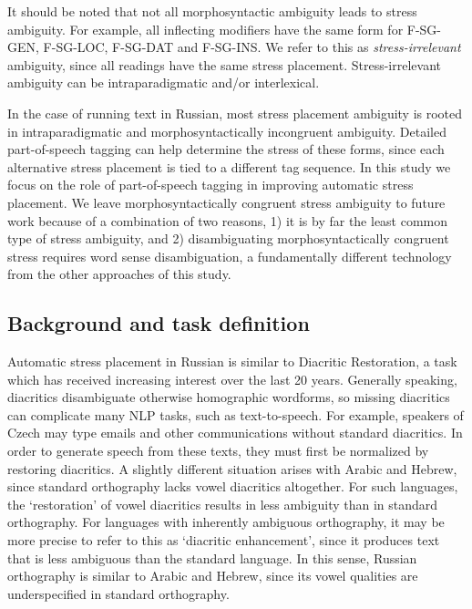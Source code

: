 \documentclass[11pt]{article}
\begin{document}
It should be noted that not all morphosyntactic ambiguity leads to stress 
ambiguity. For example, all inflecting modifiers have the same form for F-SG-GEN, 
F-SG-LOC, F-SG-DAT and F-SG-INS. We refer to this as \emph{stress-irrelevant} 
ambiguity, since all readings have
the same stress placement. Stress-irrelevant ambiguity can be intraparadigmatic 
and/or interlexical. 

In the case of running text in Russian, most stress placement 
ambiguity is rooted in intraparadigmatic and morphosyntactically incongruent 
ambiguity. Detailed part-of-speech tagging can help determine the stress of 
these forms, since each alternative stress placement is tied to a different
tag sequence. In this study we focus on 
the role of part-of-speech tagging in improving
automatic stress placement. We leave morphosyntactically congruent stress 
ambiguity to future work because of a combination of two reasons, 1) it is by far the least common type of stress ambiguity, and 2) disambiguating morphosyntactically congruent stress requires word sense disambiguation, a fundamentally different technology from the other approaches of this study.

\subsection{Background and task definition} \label{background}

Automatic stress placement in Russian is similar to Diacritic Restoration, a task
which has received increasing interest over the last 20 years. Generally 
speaking, diacritics disambiguate otherwise homographic wordforms, so missing 
diacritics can complicate many NLP tasks, such as text-to-speech. For example, 
speakers of Czech may type emails and other communications
without standard diacritics. In order to generate speech from these texts, they 
must first be normalized by restoring diacritics. A slightly different
situation arises with Arabic and Hebrew, since standard orthography lacks vowel 
diacritics altogether. For such languages, the `restoration' of vowel diacritics 
results in less ambiguity than in standard orthography. For languages with 
inherently ambiguous orthography,
it may be more precise to refer to this as `diacritic enhancement', since it 
produces text that is less ambiguous than the standard language. In this sense, 
Russian orthography is similar to Arabic and Hebrew, since its vowel qualities 
are underspecified in standard orthography.
\end{document}
